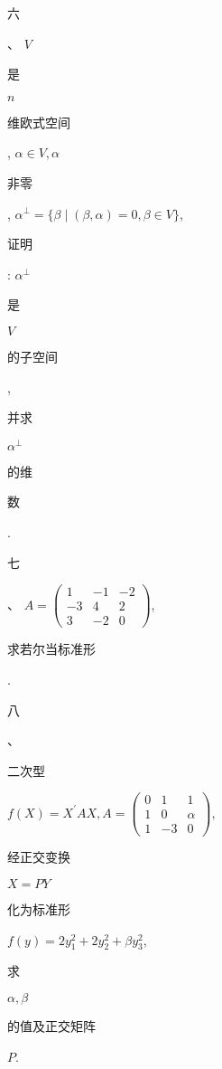 \documentclass[10pt]{article}
\begin{document}
\begin{CJK}{UTF8}{mj}六\end{CJK}、 $V$ \begin{CJK}{UTF8}{mj}是\end{CJK} $n$ \begin{CJK}{UTF8}{mj}维欧式空间\end{CJK}, $\alpha \in V, \alpha$ \begin{CJK}{UTF8}{mj}非零\end{CJK}, $\alpha^{\perp}=\{\beta \mid(\beta, \alpha)=0, \beta \in V\}$, \begin{CJK}{UTF8}{mj}证明\end{CJK}: $\alpha^{\perp}$ \begin{CJK}{UTF8}{mj}是\end{CJK} $V$ \begin{CJK}{UTF8}{mj}的子空间\end{CJK}, \begin{CJK}{UTF8}{mj}并求\end{CJK} $\alpha^{\perp}$ \begin{CJK}{UTF8}{mj}的维\end{CJK} \begin{CJK}{UTF8}{mj}数\end{CJK}.

\begin{CJK}{UTF8}{mj}七\end{CJK}、 $A=\left(\begin{array}{ccc}1 & -1 & -2 \\ -3 & 4 & 2 \\ 3 & -2 & 0\end{array}\right)$, \begin{CJK}{UTF8}{mj}求若尔当标准形\end{CJK}.

\begin{CJK}{UTF8}{mj}八\end{CJK}、 \begin{CJK}{UTF8}{mj}二次型\end{CJK} $f(X)=X^{\prime} A X, A=\left(\begin{array}{ccc}0 & 1 & 1 \\ 1 & 0 & \alpha \\ 1 & -3 & 0\end{array}\right)$, \begin{CJK}{UTF8}{mj}经正交变换\end{CJK} $X=P Y$ \begin{CJK}{UTF8}{mj}化为标准形\end{CJK} $f(y)=2 y_{1}^{2}+2 y_{2}^{2}+\beta y_{3}^{2}$, \begin{CJK}{UTF8}{mj}求\end{CJK} $\alpha, \beta$ \begin{CJK}{UTF8}{mj}的值及正交矩阵\end{CJK} $P$.
\end{document}
